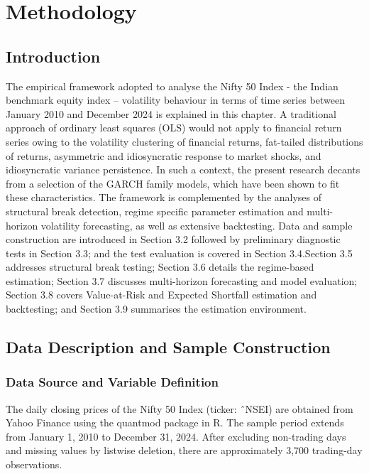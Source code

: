 \chapter{Methodology}

\section{ Introduction}

The empirical framework adopted to analyse the Nifty 50 Index - the Indian benchmark equity index – volatility behaviour in terms of time series between January 2010 and December 2024 is explained in this chapter. A traditional approach of ordinary least squares (OLS) would not apply to financial return series owing to the volatility clustering of financial returns, fat-tailed distributions of returns, asymmetric and idiosyncratic response to market shocks, and idiosyncratic variance persistence. In such a context, the present research decants from a selection of the GARCH family models, which have been shown to fit these characteristics. The framework is complemented by the analyses of structural break detection, regime specific parameter estimation and multi-horizon volatility forecasting, as well as extensive backtesting.
Data and sample construction are introduced in Section 3.2 followed by preliminary diagnostic tests in Section 3.3; and the test evaluation is covered in Section 3.4.Section 3.5 addresses structural break testing; Section 3.6 details the regime-based estimation; Section 3.7 discusses multi-horizon forecasting and model evaluation; Section 3.8 covers Value-at-Risk and Expected Shortfall estimation and backtesting; and Section 3.9 summarises the estimation environment.





\section{Data Description and Sample Construction}
\subsection{Data Source and Variable Definition}
The daily closing prices of the Nifty 50 Index (ticker: ˆNSEI) are obtained from Yahoo Finance using the quantmod package in R. The sample period extends from January 1, 2010 to December 31, 2024.
After excluding non-trading days and missing values by listwise deletion, there are approximately 3,700 trading-day observations.


